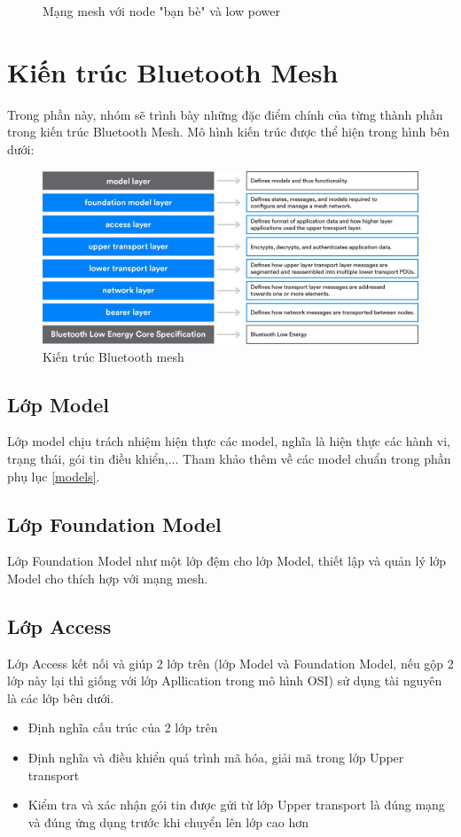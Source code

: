 \begin{itemize}
\begin{figure}[h!]
\begin{center}
        		    \caption{Mạng mesh với node "bạn bè" và low power}
        	    \end{center}
            \end{figure}
        \end{itemize}
        \newpage
    \section{Kiến trúc Bluetooth Mesh}
    Trong phần này, nhóm sẽ trình bày những đặc điểm chính của từng thành phần trong kiến trúc Bluetooth Mesh. Mô hình kiến trúc được thể hiện trong hình bên dưới:
    
    \begin{figure}[h!]
    	\begin{center}
    		\includegraphics[scale=0.8]{images/mesh-architexture.jpg}
    		\caption{Kiến trúc Bluetooth mesh}
    	\end{center}
    \end{figure}
    
    \subsection{Lớp Model}
    Lớp model chịu trách nhiệm hiện thực các model, nghĩa là hiện thực các hành vi, trạng thái, gói tin điều khiển,... Tham khảo thêm về các model chuẩn trong phần phụ lục \ref{models}.
    \subsection{Lớp Foundation Model}
    Lớp Foundation Model như một lớp đệm cho lớp Model, thiết lập và quản lý lớp Model cho thích hợp với mạng mesh.
    \subsection{Lớp Access}
    Lớp Access kết nối và giúp 2 lớp trên (lớp Model và Foundation Model, nếu gộp 2 lớp này lại thì giống với lớp Apllication trong mô hình OSI) sử dụng tài nguyên là các lớp bên dưới.
    \begin{itemize}
        \item Định nghĩa cấu trúc của 2 lớp trên
        \item Định nghĩa và điều khiển quá trình mã hóa, giải mã trong lớp Upper transport
        \item Kiểm tra và xác nhận gói tin được gửi từ lớp Upper transport là đúng mạng và đúng ứng dụng trước khi chuyển lên lớp cao hơn
    \end{itemize}
